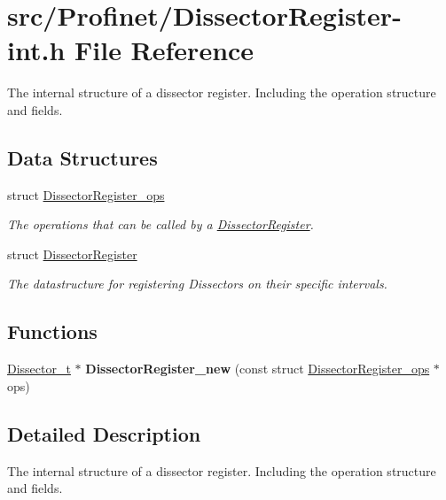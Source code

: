 \hypertarget{_dissector_register-int_8h}{\section{src/\-Profinet/\-Dissector\-Register-\/int.h File Reference}
\label{_dissector_register-int_8h}
}


The internal structure of a dissector register. Including the operation structure and fields.  


\subsection*{Data Structures}
\begin{DoxyCompactItemize}
\item 
struct \hyperlink{struct_dissector_register__ops}{Dissector\-Register\-\_\-ops}
\begin{DoxyCompactList}\small\item\em The operations that can be called by a \hyperlink{struct_dissector_register}{Dissector\-Register}. \end{DoxyCompactList}\item 
struct \hyperlink{struct_dissector_register}{Dissector\-Register}
\begin{DoxyCompactList}\small\item\em The datastructure for registering Dissectors on their specific intervals. \end{DoxyCompactList}\end{DoxyCompactItemize}
\subsection*{Functions}
\begin{DoxyCompactItemize}
\item 
\hypertarget{_dissector_register-int_8h_a1fc9ce5db61206b38e9bfb2b6d7bebd0}{\hyperlink{struct_dissector}{Dissector\-\_\-t} $\ast$ {\bfseries Dissector\-Register\-\_\-new} (const struct \hyperlink{struct_dissector_register__ops}{Dissector\-Register\-\_\-ops} $\ast$ops)}\label{_dissector_register-int_8h_a1fc9ce5db61206b38e9bfb2b6d7bebd0}

\end{DoxyCompactItemize}


\subsection{Detailed Description}
The internal structure of a dissector register. Including the operation structure and fields. 